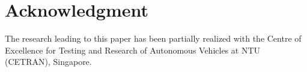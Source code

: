 \section*{Acknowledgment}

The research leading to this paper has been partially realized with the Centre of Excellence for Testing and Research of Autonomous Vehicles at NTU (CETRAN), Singapore. 
